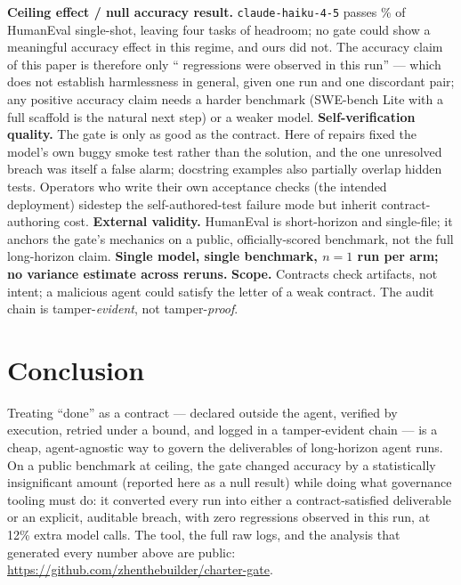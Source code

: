 \documentclass{article}
\begin{document}
\textbf{Ceiling effect / null accuracy result.} \texttt{claude-haiku-4-5} passes
\numpAa\% of HumanEval single-shot, leaving four tasks of headroom; no gate could
show a meaningful accuracy effect in this regime, and ours did not. The accuracy
claim of this paper is therefore only ``\numbbroke{} regressions were observed in
this run'' --- which does not establish harmlessness in general, given one run and
one discordant pair; any positive accuracy claim needs a harder benchmark (SWE-bench Lite
with a full scaffold is the natural next step) or a weaker model.
\textbf{Self-verification quality.} The gate is only as good as the contract. Here
\numrepairedfalsealarm{} of \numrepairedB{} repairs fixed the model's own buggy
smoke test rather than the solution, and the one unresolved breach was itself a
false alarm; docstring examples also partially overlap hidden tests. Operators who
write their own acceptance checks (the intended deployment) sidestep the
self-authored-test failure mode but inherit contract-authoring cost.
\textbf{External validity.} HumanEval is short-horizon and single-file; it anchors
the gate's mechanics on a public, officially-scored benchmark, not the full
long-horizon claim. \textbf{Single model, single benchmark, $n=1$ run per arm; no
variance estimate across reruns.} \textbf{Scope.} Contracts check artifacts, not
intent; a malicious agent could satisfy the letter of a weak contract. The audit
chain is tamper-\emph{evident}, not tamper-\emph{proof}.

\section{Conclusion}
Treating ``done'' as a contract --- declared outside the agent, verified by
execution, retried under a bound, and logged in a tamper-evident chain --- is a
cheap, agent-agnostic way to govern the deliverables of long-horizon agent runs. On
a public benchmark at ceiling, the gate changed accuracy by a statistically
insignificant amount (reported here as a null result) while doing what governance
tooling must do: it converted every run into either a contract-satisfied deliverable
or an explicit, auditable breach, with zero regressions observed in this run, at
12\% extra model calls.
The tool, the full raw logs, and the analysis that generated every number above are
public: \url{https://github.com/zhenthebuilder/charter-gate}.
\end{document}
